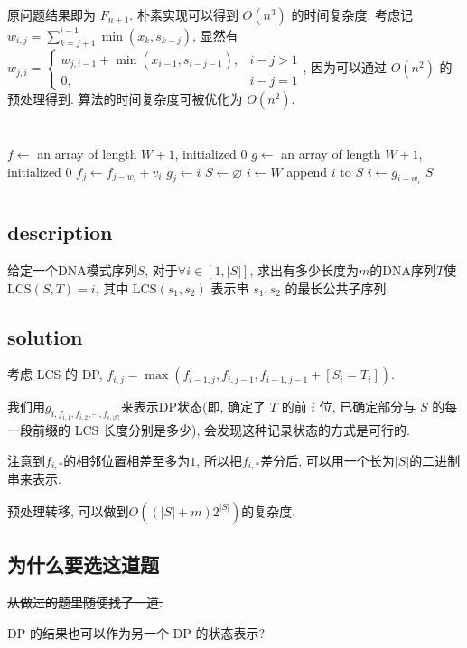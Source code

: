 \documentclass[8pt]{article}
\begin{document}
原问题结果即为 $F_{n + 1}$. 朴素实现可以得到 $O(n^3)$ 的时间复杂度. 考虑记 $w_{i,j} = \sum\limits_{k=j+1}^{i-1}\min(x_k, s_{k - j})$, 显然有 $w_{j,i} = \begin{cases}
	w_{j, i - 1} + \min(x_{i-1}, s_{i-j-1}), & i - j > 1\\
	0, & i - j = 1
\end{cases}$, 因为可以通过 $O(n^2)$ 的预处理得到. 算法的时间复杂度可被优化为 $O(n^2)$.

\newpage
\section{}
\begin{center}
	\begin{algorithmic}[1]
			\State $f \gets$ an array of length $W + 1$, initialized $0$
			\State $g \gets$ an array of length $W + 1$, initialized $0$
						\State $f_j \gets f_{j - w_i} + v_i$
						\State $g_j \gets i$
					\EndIf
				\EndFor
			\EndFor
			\State $S \gets \varnothing$
			\State $i \gets W$
				\State append $i$ to $S$
				\State $i \gets g_{i - w_i}$
			\EndWhile
			\State \Return $S$
		\EndFunction
	\end{algorithmic}
\end{center}

\section{}

\subsection{description}
	给定一个DNA模式序列$S$, 对于$\forall i \in [1, |S|]$, 求出有多少长度为$m$的DNA序列$T$使$\textrm{LCS}(S, T) = i$, 其中 $\textrm{LCS}(s_1, s_2)$ 表示串 $s_1, s_2$ 的最长公共子序列. 
\subsection{solution}
	考虑 LCS 的 DP, $f_{i,j} = \max(f_{i-1,j}, f_{i, j-1}, f_{i-1, j-1} + [S_i = T_i])$. 
	
	我们用$g_{i, f_{i, 1}, f_{i, 2}, \cdots, f_{i, |S|}}$来表示DP状态(即, 确定了 $T$ 的前 $i$ 位, 已确定部分与 $S$ 的每一段前缀的 LCS 长度分别是多少), 会发现这种记录状态的方式是可行的. 
	
	注意到$f_{i, *}$的相邻位置相差至多为$1$, 所以把$f_{i, *}$差分后, 可以用一个长为$|S|$的二进制串来表示. 
	
	预处理转移, 可以做到$O((|S| + m)2^{|S|})$的复杂度. 
\subsection{为什么要选这道题}
	\sout{\kaishu 从做过的题里随便找了一道.}

	DP 的结果也可以作为另一个 DP 的状态表示?
\end{document}
